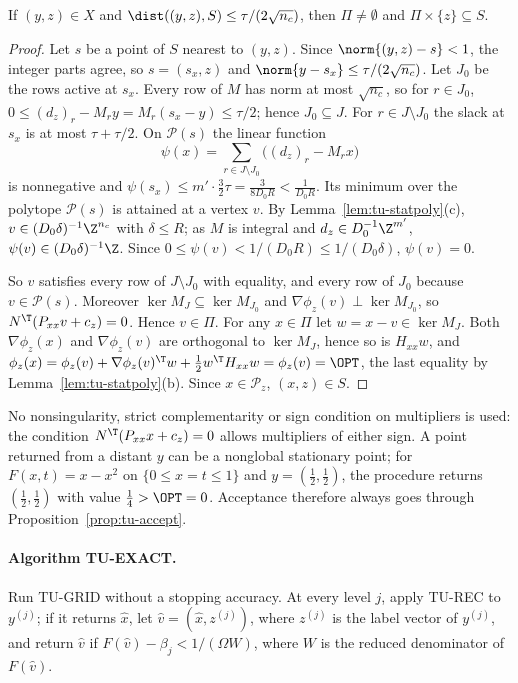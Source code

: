 \begin{lemma}\label{lem:tu-snap}
If $(y,z)\in X$ and $\dist((y,z),S)\le\tau/(2\sqrt{n_c})$, then $\Pi\ne\emptyset$
and $\Pi\times\{z\}\subseteq S$.
\end{lemma}

\begin{proof}
Let $s$ be a point of $S$ nearest to $(y,z)$. Since $\norm{(y,z)-s}<1$, the
integer parts agree, so $s=(s_x,z)$ and $\norm{y-s_x}\le\tau/(2\sqrt{n_c})$. Let
$J_0$ be the rows active at $s_x$. Every row of $M$ has norm at most $\sqrt{n_c}$,
so for $r\in J_0$, $0\le(d_z)_r-M_ry=M_r(s_x-y)\le\tau/2$; hence $J_0\subseteq J$.
For $r\in J\setminus J_0$ the slack at $s_x$ is at most $\tau+\tau/2$. On
$\mathcal P(s)$ the linear function
\[
\psi(x)=\sum_{r\in J\setminus J_0}\bigl((d_z)_r-M_rx\bigr)
\]
is nonnegative and $\psi(s_x)\le m'\cdot\frac32\tau=\frac3{8D_0R}<\frac1{D_0R}$.
Its minimum over the polytope $\mathcal P(s)$ is attained at a vertex $v$. By
Lemma~\ref{lem:tu-statpoly}(c), $v\in(D_0\delta)^{-1}\Z^{n_c}$ with $\delta\le R$; as $M$
is integral and $d_z\in D_0^{-1}\Z^{m'}$, $\psi(v)\in(D_0\delta)^{-1}\Z$. Since
$0\le\psi(v)<1/(D_0R)\le1/(D_0\delta)$, $\psi(v)=0$.

So $v$ satisfies every row of $J\setminus J_0$ with equality, and every row of
$J_0$ because $v\in\mathcal P(s)$. Moreover $\ker M_J\subseteq\ker M_{J_0}$ and
$\nabla\phi_z(v)\perp\ker M_{J_0}$, so $N^{\T}(P_{xx}v+c_z)=0$. Hence $v\in\Pi$.
For any $x\in\Pi$ let $w=x-v\in\ker M_J$. Both $\nabla\phi_z(x)$ and
$\nabla\phi_z(v)$ are orthogonal to $\ker M_J$, hence so is $H_{xx}w$, and
$\phi_z(x)=\phi_z(v)+\nabla\phi_z(v)^{\T}w+\frac12w^{\T}H_{xx}w=\phi_z(v)=\OPT$,
the last equality by Lemma~\ref{lem:tu-statpoly}(b). Since $x\in\mathcal P_z$,
$(x,z)\in S$.
\end{proof}

No nonsingularity, strict complementarity or sign condition on multipliers is
used: the condition $N^{\T}(P_{xx}x+c_z)=0$ allows multipliers of either
sign. A point returned from a distant $y$ can be a nonglobal stationary point;
for $F(x,t)=x-x^2$ on $\{0\le x=t\le1\}$ and $y=(\frac12,\frac12)$, the procedure
returns $(\frac12,\frac12)$ with value $\frac14>\OPT=0$. Acceptance therefore always
goes through Proposition~\ref{prop:tu-accept}.

\paragraph{Algorithm TU-EXACT.}
Run TU-GRID without a stopping accuracy. At every level $j$, apply TU-REC to
$y^{(j)}$; if it returns $\hat x$, let $\hat v=(\hat x,z^{(j)})$, where
$z^{(j)}$ is the label vector of $y^{(j)}$, and return $\hat v$ if
$F(\hat v)-\beta_j<1/(\Omega W)$, where $W$ is the reduced denominator of
$F(\hat v)$.

